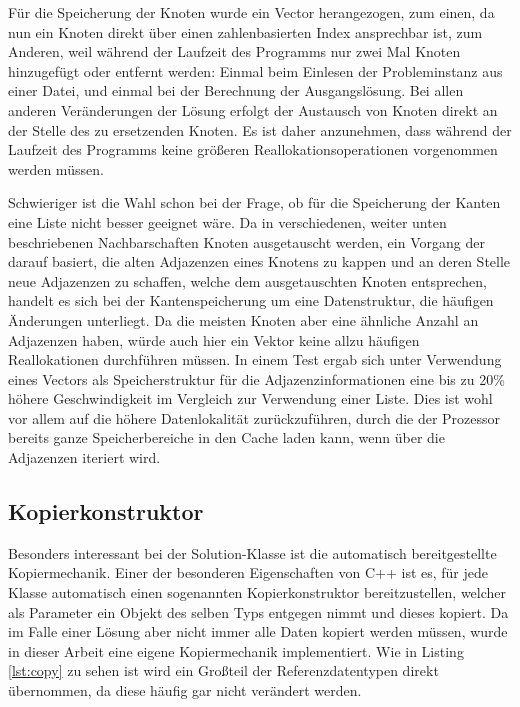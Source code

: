 Für die Speicherung der Knoten wurde ein Vector herangezogen, zum einen, da nun ein Knoten direkt über einen zahlenbasierten Index ansprechbar ist, zum Anderen, weil während der Laufzeit des Programms nur
zwei Mal Knoten hinzugefügt oder entfernt werden: Einmal beim Einlesen der Probleminstanz aus einer Datei, und einmal bei der Berechnung der Ausgangslösung. Bei allen anderen Veränderungen der Lösung erfolgt
der Austausch von Knoten direkt an der Stelle des zu ersetzenden Knoten. Es ist daher anzunehmen, dass während der Laufzeit des Programms keine größeren Reallokationsoperationen vorgenommen werden müssen.

Schwieriger ist die Wahl schon bei der Frage, ob für die Speicherung der Kanten eine Liste nicht besser geeignet wäre. Da in verschiedenen, weiter unten beschriebenen Nachbarschaften Knoten ausgetauscht werden,
ein Vorgang der darauf basiert, die alten Adjazenzen eines Knotens zu kappen und an deren Stelle neue Adjazenzen zu schaffen, welche dem ausgetauschten Knoten entsprechen, handelt es sich bei der Kantenspeicherung
um eine Datenstruktur, die häufigen Änderungen unterliegt. Da die meisten Knoten aber eine ähnliche Anzahl an Adjazenzen haben, würde auch hier ein Vektor keine allzu häufigen Reallokationen durchführen müssen.
In einem Test ergab sich unter Verwendung eines Vectors als Speicherstruktur für die Adjazenzinformationen eine bis zu 20\% höhere Geschwindigkeit im Vergleich zur Verwendung einer Liste. Dies ist wohl vor allem
auf die höhere Datenlokalität zurückzuführen, durch die der Prozessor bereits ganze Speicherbereiche in den Cache laden kann, wenn über die Adjazenzen iteriert wird.

\subsection{Kopierkonstruktor}
\label{sec:copy}

Besonders interessant bei der Solution-Klasse ist die automatisch bereitgestellte Kopiermechanik. Einer der besonderen Eigenschaften von C++ ist es, für jede Klasse automatisch einen sogenannten Kopierkonstruktor
bereitzustellen, welcher als Parameter ein Objekt des selben Typs entgegen nimmt und dieses kopiert. Da im Falle einer Lösung aber nicht immer alle Daten kopiert werden müssen, wurde in dieser Arbeit eine
eigene Kopiermechanik implementiert. Wie in Listing \ref{lst:copy} zu sehen ist wird ein Großteil der Referenzdatentypen direkt übernommen, da diese häufig gar nicht verändert werden. 

